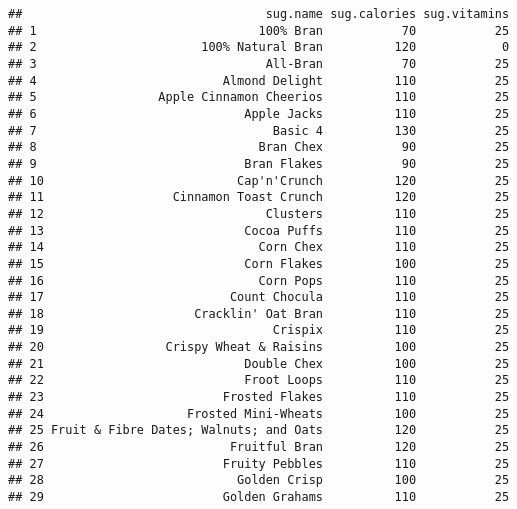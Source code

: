 \documentclass[
]{article}
\newenvironment{Shaded}{\begin{snugshade}}{\end{snugshade}}
\newcommand{\FunctionTok}[1]{\textcolor[rgb]{0.00,0.00,0.00}{#1}}
\newcommand{\NormalTok}[1]{#1}
\newcommand{\SpecialCharTok}[1]{\textcolor[rgb]{0.00,0.00,0.00}{#1}}
\begin{document}
\begin{Shaded}
\end{Shaded}

\begin{verbatim}
##                                  sug.name sug.calories sug.vitamins
## 1                               100% Bran           70           25
## 2                       100% Natural Bran          120            0
## 3                                All-Bran           70           25
## 4                          Almond Delight          110           25
## 5                 Apple Cinnamon Cheerios          110           25
## 6                             Apple Jacks          110           25
## 7                                 Basic 4          130           25
## 8                               Bran Chex           90           25
## 9                             Bran Flakes           90           25
## 10                           Cap'n'Crunch          120           25
## 11                  Cinnamon Toast Crunch          120           25
## 12                               Clusters          110           25
## 13                            Cocoa Puffs          110           25
## 14                              Corn Chex          110           25
## 15                            Corn Flakes          100           25
## 16                              Corn Pops          110           25
## 17                          Count Chocula          110           25
## 18                     Cracklin' Oat Bran          110           25
## 19                                Crispix          110           25
## 20                 Crispy Wheat & Raisins          100           25
## 21                            Double Chex          100           25
## 22                            Froot Loops          110           25
## 23                         Frosted Flakes          110           25
## 24                    Frosted Mini-Wheats          100           25
## 25 Fruit & Fibre Dates; Walnuts; and Oats          120           25
## 26                          Fruitful Bran          120           25
## 27                         Fruity Pebbles          110           25
## 28                           Golden Crisp          100           25
## 29                         Golden Grahams          110           25

\end{verbatim}
\end{document}
